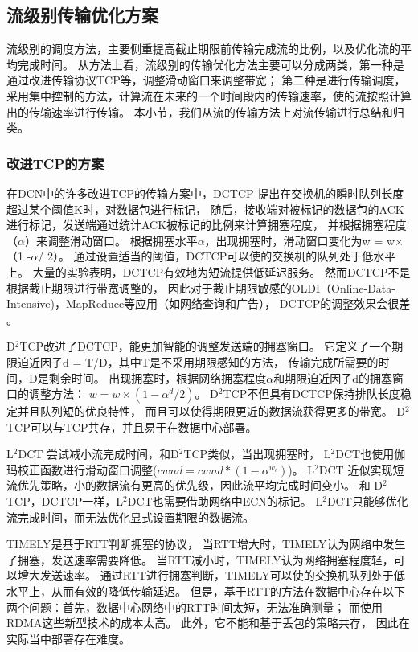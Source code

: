 \subsection{流级别传输优化方案}
流级别的调度方法，主要侧重提高截止期限前传输完成流的比例，以及优化流的平均完成时间。
从方法上看，流级别的传输优化方法主要可以分成两类，第一种是通过改进传输协议TCP等，调整滑动窗口来调整带宽；
第二种是进行传输调度，采用集中控制的方法，计算流在未来的一个时间段内的传输速率，使的流按照计算出的传输速率进行传输。
本小节，我们从流的传输方法上对流传输进行总结和归类。

\subsubsection{改进TCP的方案} 
在DCN中的许多改进TCP的传输方案中，DCTCP\cite{DCTCP}
提出在交换机的瞬时队列长度超过某个阈值K时，对数据包进行标记，
随后，接收端对被标记的数据包的ACK进行标记，发送端通过统计ACK被标记的比例来计算拥塞程度，
并根据拥塞程度（$\alpha$）来调整滑动窗口。
根据拥塞水平$\alpha$，出现拥塞时，滑动窗口变化为w = w$\times$（1 -$\alpha$/ 2）。
通过设置适当的阈值，DCTCP可以使的交换机的队列处于低水平上。
大量的实验表明，DCTCP有效地为短流提供低延迟服务。
然而DCTCP不是根据截止期限进行带宽调整的，
因此对于截止期限敏感的OLDI（Online-Data-Intensive)，MapReduce等应用（如网络查询和广告），
DCTCP的调整效果会很差 \cite{D2TCP}。

 D$^2$TCP改进了DCTCP，能更加智能的调整发送端的拥塞窗口。
 它定义了一个期限迫近因子d = T/D，其中T是不采用期限感知的方法，
 传输完成所需要的时间，D是剩余时间。
 出现拥塞时，根据网络拥塞程度$\alpha$和期限迫近因子d的拥塞窗口的调整方法：
$w=w \times (1-\alpha^{d}/2)$。
D$^2$TCP不但具有DCTCP保持排队长度稳定并且队列短的优良特性，
 而且可以使得期限更近的数据流获得更多的带宽。
 D$^2$TCP可以与TCP共存，并且易于在数据中心部署。
 
L$^2$DCT \cite{L2DCT} 尝试减小流完成时间，和D$^2$TCP类似，当出现拥塞时，
L$^2$DCT也使用伽玛校正函数进行滑动窗口调整($cwnd = cwnd*(1-\alpha^{w_c})$)。
L$^2$DCT 近似实现短流优先策略，小的数据流有更高的优先级，因此流平均完成时间变小。
和 D$^2$TCP，DCTCP一样，L$^2$DCT也需要借助网络中ECN的标记。
L$^2$DCT只能够优化流完成时间，而无法优化显式设置期限的数据流。
 
  
TIMELY\cite{mittal2015timely}是基于RTT判断拥塞的协议，
当RTT增大时，TIMELY认为网络中发生了拥塞，发送速率需要降低。
当RTT减小时，TIMELY认为网络拥塞程度轻，可以增大发送速率。
通过RTT进行拥塞判断，TIMELY可以使的交换机队列处于低水平上，从而有效的降低传输延迟。
但是，基于RTT的方法在数据中心存在以下两个问题：首先，数据中心网络中的RTT时间太短，无法准确测量；
而使用RDMA这些新型技术的成本太高。
此外，它不能和基于丢包的策略共存，
因此在实际当中部署存在难度。

